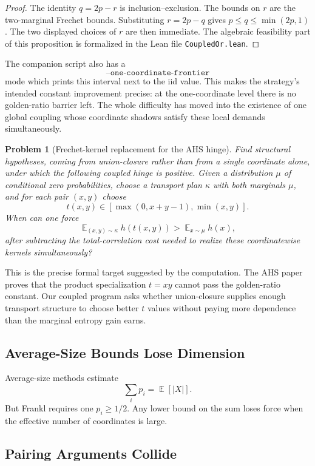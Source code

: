 \documentclass[11pt]{article}
\newtheorem{problem}{Problem}
\DeclareMathOperator{\E}{\mathbb{E}}
\begin{document}
\begin{proof}
The identity $q=2p-r$ is inclusion--exclusion.  The bounds on $r$ are the
two-marginal Frechet bounds.  Substituting $r=2p-q$ gives
$p\le q\le\min(2p,1)$.  The two displayed choices of $r$ are then immediate.
The algebraic feasibility part of this proposition is formalized in the Lean
file \texttt{CoupledOr.lean}.
\end{proof}

The companion script also has a
\[
  \texttt{--one-coordinate-frontier}
\]
mode which prints this interval next to the iid value.  This makes the
strategy's intended constant improvement precise: at the one-coordinate level
there is no golden-ratio barrier left.  The whole difficulty has moved into
the existence of one global coupling whose coordinate shadows satisfy these
local demands simultaneously.

\begin{problem}[Frechet-kernel replacement for the AHS hinge]
Find structural hypotheses, coming from union-closure rather than from a
single coordinate alone, under which the following coupled hinge is positive.
Given a distribution $\mu$ of conditional zero probabilities, choose a
transport plan $\kappa$ with both marginals $\mu$, and for each pair $(x,y)$
choose
\[
  t(x,y)\in[\max(0,x+y-1),\min(x,y)].
\]
When can one force
\[
  \E_{(x,y)\sim\kappa} h(t(x,y))>\E_{x\sim\mu}h(x),
\]
after subtracting the total-correlation cost needed to realize these
coordinatewise kernels simultaneously?
\end{problem}

This is the precise formal target suggested by the computation.  The AHS
paper proves that the product specialization $t=xy$ cannot pass the
golden-ratio constant.  Our coupled program asks whether union-closure supplies
enough transport structure to choose better $t$ values without paying more
dependence than the marginal entropy gain earns.

\subsection{Average-Size Bounds Lose Dimension}

Average-size methods estimate
\[
  \sum_i p_i = \E[|X|].
\]
But Frankl requires one $p_i \geq 1/2$.  Any lower bound on the sum loses force
when the effective number of coordinates is large.

\subsection{Pairing Arguments Collide}
\end{document}
